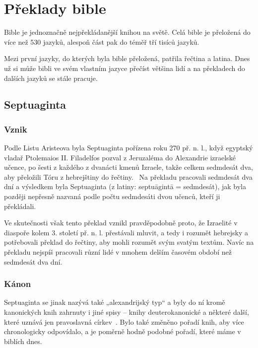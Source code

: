 \documentclass[a4rpaper,11pt,oneside]{article}
\begin{document}
\section{Překlady bible}

Bible je jednoznačně nejpřekládanější knihou na světě. Celá bible je přeložená do více než 530 jazyků, alespoň část pak do téměř tří tisíců jazyků.~\cite{wycliffe}

Mezi první jazyky, do kterých byla bible přeložená, patřila řečtina a latina. Dnes už si může bibli ve svém vlastním jazyce přečíst většina lidí a na překladech do dalších jazyků se stále pracuje.

\subsection{Septuaginta}

\subsubsection{Vznik}
Podle Listu Aristeova byla Septuaginta  pořízena roku 270 př. n. l., když egyptský vladař Ptolemaios II. Filadelfos pozval z Jeruzaléma do Alexandrie izraelské učence, po šesti z každého z dvanácti kmenů Izraele, takže celkem sedmdesát dva, aby přeložili Tóru z hebrejštiny do řečtiny.~\cite{LXX}  Na překladu pracovali sedmdesát dva dní a výsledkem byla Septuaginta   (z latiny: septuāgintā = sedmdesát), jak byla později nepřesně nazvaná podle počtu sedmdesáti dvou učenců, kteří ji překládali.

Ve skutečnosti však tento překlad vznikl pravděpodobně proto, že Izraelité  v diaspoře kolem 3. století př. n. l. přestávali mluvit, a tedy i rozumět hebrejsky a potřebovali překlad do řečtiny, aby mohli rozumět svým svatým textům. Navíc na překladu nejspíš pracovali různí lidé v mnohem delším časovém období než sedmdesát dva dní.

\subsubsection{Kánon}
Septuaginta   se jinak nazývá také „alexandrijský typ“ a byly do ní kromě kanonických knih zahrnuty i jiné spisy – knihy deuterokanonické a některé další, které uznává jen pravoslavná církev~\cite{kanon}. Bylo také změněno pořadí knih, aby více chronologicky odpovídalo, a je poměrně hodně podobné pořadí, které máme v biblích dnes.
\end{document}
